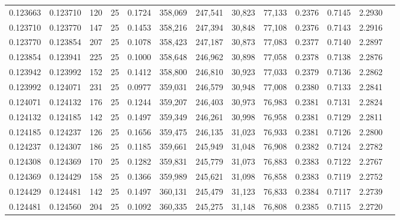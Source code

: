 \begin{tabular}{rrrrrrrrrrrrr}
0.123663 & 0.123710 &   120 &  25 &                                     0.1724 & 358,069 & 247,541 &  30,823 &  77,133 & 0.2376 & 0.7145 & 2.2930 \\
0.123710 & 0.123770 &   147 &  25 &                                     0.1453 & 358,216 & 247,394 &  30,848 &  77,108 & 0.2376 & 0.7143 & 2.2916 \\
0.123770 & 0.123854 &   207 &  25 &                                     0.1078 & 358,423 & 247,187 &  30,873 &  77,083 & 0.2377 & 0.7140 & 2.2897 \\
0.123854 & 0.123941 &   225 &  25 &                                     0.1000 & 358,648 & 246,962 &  30,898 &  77,058 & 0.2378 & 0.7138 & 2.2876 \\
0.123942 & 0.123992 &   152 &  25 &                                     0.1412 & 358,800 & 246,810 &  30,923 &  77,033 & 0.2379 & 0.7136 & 2.2862 \\
0.123992 & 0.124071 &   231 &  25 &                                     0.0977 & 359,031 & 246,579 &  30,948 &  77,008 & 0.2380 & 0.7133 & 2.2841 \\
0.124071 & 0.124132 &   176 &  25 &                                     0.1244 & 359,207 & 246,403 &  30,973 &  76,983 & 0.2381 & 0.7131 & 2.2824 \\
0.124132 & 0.124185 &   142 &  25 &                                     0.1497 & 359,349 & 246,261 &  30,998 &  76,958 & 0.2381 & 0.7129 & 2.2811 \\
0.124185 & 0.124237 &   126 &  25 &                                     0.1656 & 359,475 & 246,135 &  31,023 &  76,933 & 0.2381 & 0.7126 & 2.2800 \\
0.124237 & 0.124307 &   186 &  25 &                                     0.1185 & 359,661 & 245,949 &  31,048 &  76,908 & 0.2382 & 0.7124 & 2.2782 \\
0.124308 & 0.124369 &   170 &  25 &                                     0.1282 & 359,831 & 245,779 &  31,073 &  76,883 & 0.2383 & 0.7122 & 2.2767 \\
0.124369 & 0.124429 &   158 &  25 &                                     0.1366 & 359,989 & 245,621 &  31,098 &  76,858 & 0.2383 & 0.7119 & 2.2752 \\
0.124429 & 0.124481 &   142 &  25 &                                     0.1497 & 360,131 & 245,479 &  31,123 &  76,833 & 0.2384 & 0.7117 & 2.2739 \\
0.124481 & 0.124560 &   204 &  25 &                                     0.1092 & 360,335 & 245,275 &  31,148 &  76,808 & 0.2385 & 0.7115 & 2.2720 \\

\end{tabular}

